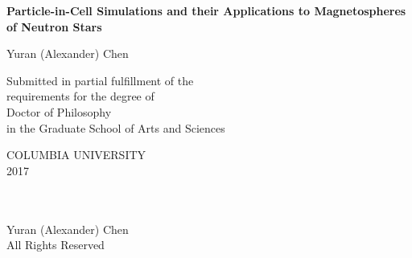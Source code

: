 
\newcommand{\thesistitle}{Particle-in-Cell Simulations and their Applications
 \protect\linebreak[1]to Magnetospheres of Neutron Stars}
\newcommand{\thesisauthor}{Yuran (Alexander) Chen}
\newcommand{\thesisyear}{2017}


$\phantom{a}$

$\phantom{a}$

$\phantom{a}$

\begin{center}

{\LARGE \bf \thesistitle}

\vskip1.0in

{\Large  \thesisauthor} \vskip0.5in

\vskip1.5in

\large
Submitted in partial fulfillment of the \\
requirements for the degree of \\
Doctor of Philosophy \\
in the Graduate School of Arts and Sciences \\

\vskip0.5in

COLUMBIA UNIVERSITY \\
\thesisyear \\

\end{center}
\clearpage

\begin{center}
\ \\
\vskip6.5in
\textcopyright \thesisyear \\[3mm]
\thesisauthor \\
All Rights Reserved
\end{center}
\clearpage

